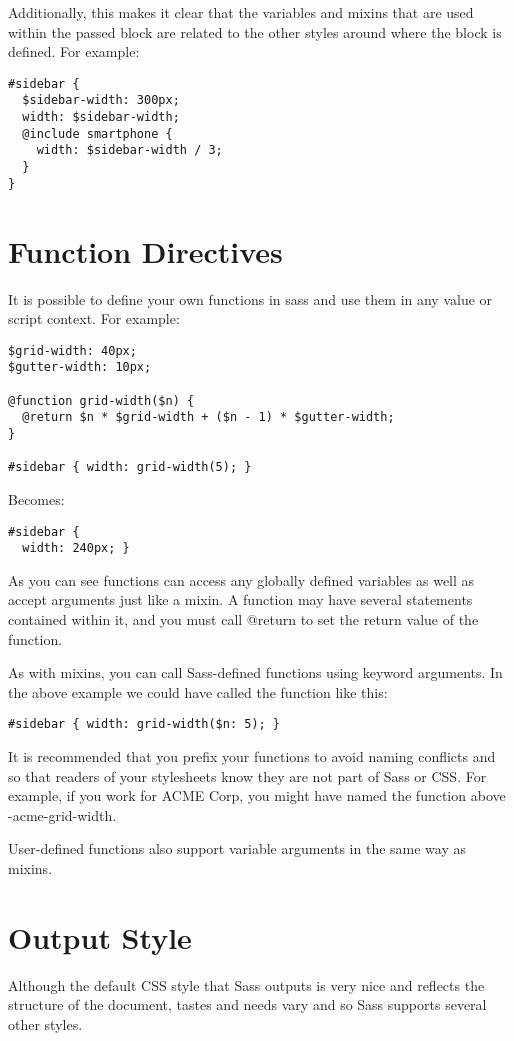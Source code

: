 \documentclass[10pt]{article}
\begin{document}
 Additionally, this makes it clear that the variables and mixins that are used within the passed block are related to the other styles around where the block is defined. For example:
\begin{verbatim}
#sidebar {
  $sidebar-width: 300px;
  width: $sidebar-width;
  @include smartphone {
    width: $sidebar-width / 3;
  }
}
\end{verbatim}
\section{Function Directives}


 It is possible to define your own functions in sass and use them in any value or script context. For example:
\begin{verbatim}
$grid-width: 40px;
$gutter-width: 10px;

@function grid-width($n) {
  @return $n * $grid-width + ($n - 1) * $gutter-width;
}

#sidebar { width: grid-width(5); }
\end{verbatim}


 Becomes:
\begin{verbatim}
#sidebar {
  width: 240px; }
\end{verbatim}


 As you can see functions can access any globally defined variables as well as accept arguments just like a mixin. A function may have several statements contained within it, and you must call @return to set the return value of the function.


 As with mixins, you can call Sass-defined functions using keyword arguments. In the above example we could have called the function like this:
\begin{verbatim}
#sidebar { width: grid-width($n: 5); }
\end{verbatim}


 It is recommended that you prefix your functions to avoid naming conflicts and so that readers of your stylesheets know they are not part of Sass or CSS. For example, if you work for ACME Corp, you might have named the function above -acme-grid-width.


 User-defined functions also support variable arguments in the same way as mixins.
\section{Output Style}


 Although the default CSS style that Sass outputs is very nice and reflects the structure of the document, tastes and needs vary and so Sass supports several other styles.
\end{document}
